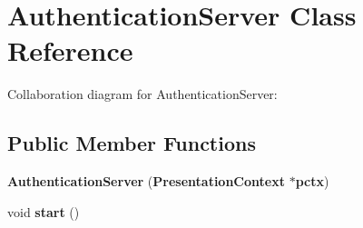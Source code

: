 \section{AuthenticationServer Class Reference}
\label{classbr_1_1pucrio_1_1telemidia_1_1ginga_1_1ncl_1_1adaptation_1_1context_1_1AuthenticationServer}
Collaboration diagram for AuthenticationServer:\subsection*{Public Member Functions}
\begin{CompactItemize}
\item 
\textbf{AuthenticationServer} ({\bf PresentationContext} $\ast${\bf pctx})\label{classbr_1_1pucrio_1_1telemidia_1_1ginga_1_1ncl_1_1adaptation_1_1context_1_1AuthenticationServer_8e97f065418144d80e0528340a6a3298}

\item 
void \textbf{start} ()\label{classbr_1_1pucrio_1_1telemidia_1_1ginga_1_1ncl_1_1adaptation_1_1context_1_1AuthenticationServer_60de64d75454385b23995437f1d72669}

\end{CompactItemize}
